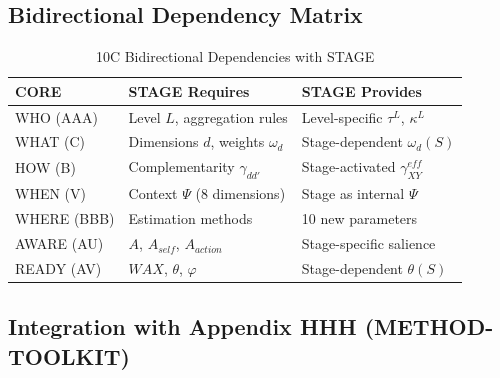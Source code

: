 \subsection{Bidirectional Dependency Matrix}

\begin{table}[htbp]
\centering
\caption{10C Bidirectional Dependencies with STAGE}
\label{tab:10c-dependencies}
\renewcommand{\arraystretch}{1.3}
\footnotesize
\begin{tabular}{@{}lp{4.5cm}p{4.5cm}@{}}
\toprule
\textbf{CORE} & \textbf{STAGE Requires} & \textbf{STAGE Provides} \\
\midrule
WHO (AAA) & Level $L$, aggregation rules & Level-specific $\tau^L$, $\kappa^L$ \\
WHAT (C) & Dimensions $d$, weights $\omega_d$ & Stage-dependent $\omega_d(S)$ \\
HOW (B) & Complementarity $\gamma_{dd'}$ & Stage-activated $\gamma_{XY}^{eff}$ \\
WHEN (V) & Context $\Psi$ (8 dimensions) & Stage as internal $\Psi$ \\
WHERE (BBB) & Estimation methods & 10 new parameters \\
AWARE (AU) & $A$, $A_{self}$, $A_{action}$ & Stage-specific salience \\
READY (AV) & $WAX$, $\theta$, $\varphi$ & Stage-dependent $\theta(S)$ \\
\bottomrule
\end{tabular}
\end{table}

\subsection{Integration with Appendix HHH (METHOD-TOOLKIT)}
\label{sec:aw-hhh-integration}

